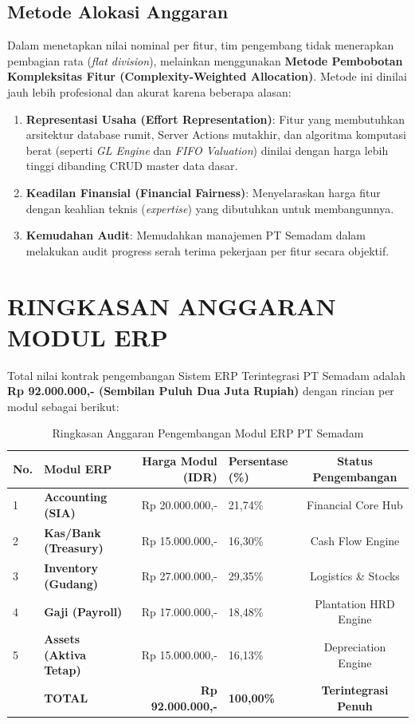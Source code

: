 \documentclass[11pt,a4paper]{article}
\begin{document}
\subsection{Metode Alokasi Anggaran}
Dalam menetapkan nilai nominal per fitur, tim pengembang tidak menerapkan pembagian rata (\textit{flat division}), melainkan menggunakan \textbf{Metode Pembobotan Kompleksitas Fitur (Complexity-Weighted Allocation)}. Metode ini dinilai jauh lebih profesional dan akurat karena beberapa alasan:
\begin{enumerate}
    \item \textbf{Representasi Usaha (Effort Representation)}: Fitur yang membutuhkan arsitektur database rumit, Server Actions mutakhir, dan algoritma komputasi berat (seperti \textit{GL Engine} dan \textit{FIFO Valuation}) dinilai dengan harga lebih tinggi dibanding CRUD master data dasar.
    \item \textbf{Keadilan Finansial (Financial Fairness)}: Menyelaraskan harga fitur dengan keahlian teknis (\textit{expertise}) yang dibutuhkan untuk membangunnya.
    \item \textbf{Kemudahan Audit}: Memudahkan manajemen PT Semadam dalam melakukan audit progress serah terima pekerjaan per fitur secara objektif.
\end{enumerate}

\newpage

\section{RINGKASAN ANGGARAN MODUL ERP}

Total nilai kontrak pengembangan Sistem ERP Terintegrasi PT Semadam adalah \textbf{Rp 92.000.000,- (Sembilan Puluh Dua Juta Rupiah)} dengan rincian per modul sebagai berikut:

\begin{table}[h!]
\centering
\small
\begin{tabular}{llrlc}
    \toprule
    \textbf{No.} & \textbf{Modul ERP} & \textbf{Harga Modul (IDR)} & \textbf{Persentase (\%)} & \textbf{Status Pengembangan} \\
    \midrule
    1 & \textbf{Accounting (SIA)} & Rp 20.000.000,- & 21,74\% & Financial Core Hub \\
    2 & \textbf{Kas/Bank (Treasury)} & Rp 15.000.000,- & 16,30\% & Cash Flow Engine \\
    3 & \textbf{Inventory (Gudang)} & Rp 27.000.000,- & 29,35\% & Logistics \& Stocks \\
    4 & \textbf{Gaji (Payroll)} & Rp 17.000.000,- & 18,48\% & Plantation HRD Engine \\
    5 & \textbf{Assets (Aktiva Tetap)} & Rp 15.000.000,- & 16,13\% & Depreciation Engine \\
    \midrule
    & \textbf{TOTAL} & \textbf{Rp 92.000.000,-} & \textbf{100,00\%} & \textbf{Terintegrasi Penuh} \\
    \bottomrule
\end{tabular}
\caption{Ringkasan Anggaran Pengembangan Modul ERP PT Semadam}
\end{table}
\end{document}
